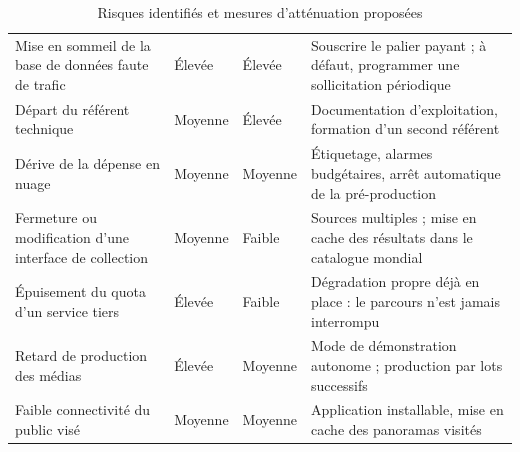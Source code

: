 \begin{table}[htbp]
\centering
\caption{Risques identifiés et mesures d'atténuation proposées}
\label{tab:risques}
\small
\begin{tabularx}{\textwidth}{|L{3.7cm}|C{2.1cm}|C{1.7cm}|X|}
\hline
{}
 &  &  &  \\ \hline
Mise en sommeil de la base de données faute de trafic & Élevée & Élevée & Souscrire le palier payant ; à défaut, programmer une sollicitation périodique \\ \hline
Départ du référent technique & Moyenne & Élevée & Documentation d'exploitation, formation d'un second référent \\ \hline
Dérive de la dépense en nuage & Moyenne & Moyenne & Étiquetage, alarmes budgétaires, arrêt automatique de la pré-production \\ \hline
Fermeture ou modification d'une interface de collection & Moyenne & Faible & Sources multiples ; mise en cache des résultats dans le catalogue mondial \\ \hline
Épuisement du quota d'un service tiers & Élevée & Faible & Dégradation propre déjà en place : le parcours n'est jamais interrompu \\ \hline
Retard de production des médias & Élevée & Moyenne & Mode de démonstration autonome ; production par lots successifs \\ \hline
Faible connectivité du public visé & Moyenne & Moyenne & Application installable, mise en cache des panoramas visités \\ \hline
\end{tabularx}
\end{table}
